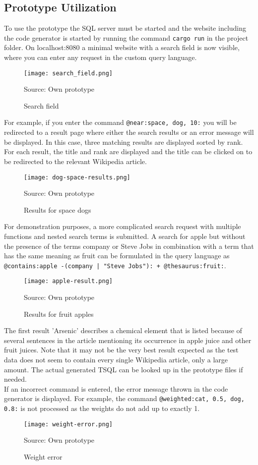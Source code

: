 \subsection{Prototype Utilization}
To use the prototype the \ac{SQL} server must be started and the website including the code generator is started by running the command \lstinline$cargo run$ in the project folder. On localhost:8080 a minimal website with a search field is now visible, where you can enter any request in the custom query language.
\begin{figure}[H]
    \caption{Search field}
    \label{fig:search}
    \texttt{[image: search\_field.png]}
    \\
    \centerline{Source: Own prototype}
\end{figure}
For example, if you enter the command \lstinline[language=Fulltext-Search]$@near:space, dog, 10:$ you will be redirected to a result page where either the search results or an error message will be displayed. In this case, three matching results are displayed sorted by rank. For each result, the title and rank are displayed and the title can be clicked on to be redirected to the relevant Wikipedia article.
\begin{figure}[H]
    \caption{Results for space dogs}
    \label{fig:space-dog}
    \texttt{[image: dog-space-results.png]}
    \\
    \centerline{Source: Own prototype}
\end{figure}
For demonstration purposes, a more complicated search request with multiple functions and nested search terms is submitted. A search for apple but without the presence of the terms company or Steve Jobs in combination with a term that has the same meaning as fruit can be formulated in the query language as \lstinline[language=Fulltext-Search]$@contains:apple -(company | "Steve Jobs"): + @thesaurus:fruit:$.
\begin{figure}[H]
    \caption{Results for fruit apples}
    \label{fig:apple-fruit}
    \texttt{[image: apple-result.png]}
    \\
    \centerline{Source: Own prototype}
\end{figure}
The first result 'Arsenic' describes a chemical element that is listed because of several sentences in the article mentioning its occurrence in apple juice and other fruit juices. Note that it may not be the very best result expected as the test data does not seem to contain every single Wikipedia article, only a large amount. The actual generated \ac{TSQL} can be looked up in the prototype files if needed.\\
If an incorrect command is entered, the error message thrown in the code generator is displayed. For example, the command \lstinline[language=Fulltext-Search]$@weighted:cat, 0.5, dog, 0.8:$ is not processed as the weights do not add up to exactly 1.
\begin{figure}[H]
    \caption{Weight error}
    \label{fig:weight-error}
    \texttt{[image: weight-error.png]}
    \\
    \centerline{Source: Own prototype}
\end{figure}
